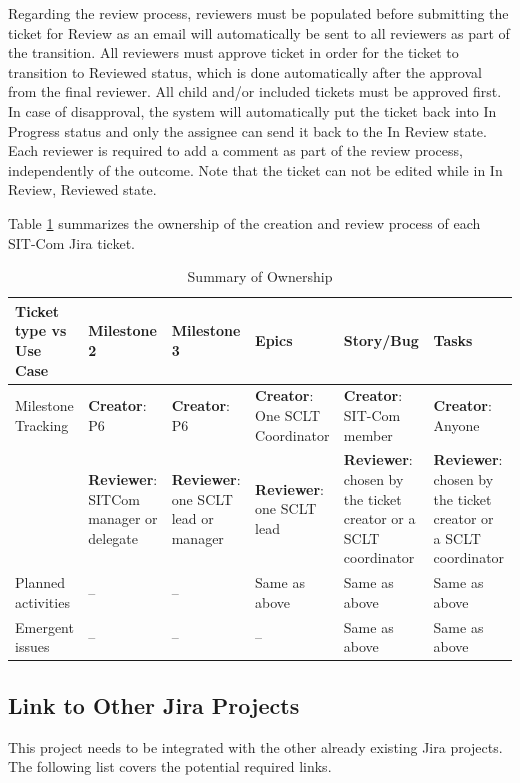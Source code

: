 \documentclass[SE,authoryear,toc]{lsstdoc}
\begin{document}
Regarding the review process, reviewers must be populated before submitting the ticket for Review as an email will automatically be sent to all reviewers as part of the transition. All reviewers must approve ticket in order for the ticket to transition to Reviewed status, which is done automatically after the approval from the final reviewer. All child and/or included tickets must be approved first. 
In case of disapproval, the system will automatically put the ticket back into In Progress status and only the assignee can send it back to the In Review state. Each reviewer is required to add a comment as part of the review process, independently of the outcome. 
Note that the ticket can not be edited while in In Review, Reviewed state.


Table \ref{tab:owner} summarizes the ownership of the creation and review process of each SIT-Com Jira ticket. 
\begin{table}
\begin{center}
\caption{\label{tab:owner} Summary of Ownership}
\begin{tabular}{|p{1.8cm}|p{1.8cm}|p{1.8cm}|p{1.8cm}|p{1.8cm}|p{1.8cm}}
\hline
Ticket type vs Use Case              & Milestone 2	& Milestone 3& Epics	& Story/Bug	& Tasks \\
\hline
\hline
Milestone Tracking & {\bf Creator}: P6 &{\bf Creator}: P6& {\bf Creator}: One SCLT Coordinator & {\bf Creator}: SIT-Com member & {\bf Creator}: Anyone \\
 & {\bf Reviewer}: SITCom manager or delegate & {\bf Reviewer}: one SCLT lead or manager & {\bf Reviewer}: one SCLT lead & {\bf Reviewer}: chosen by the ticket creator or a SCLT coordinator & {\bf Reviewer}: chosen by the ticket creator or a SCLT coordinator \\
\hline
Planned activities & -- & -- & Same as above & Same as above & Same as above \\
\hline
Emergent issues & -- & -- & -- & Same as above & Same as above \\
\hline
\end{tabular}
\end{center}
\end{table}

\subsection{Link to Other Jira Projects}
This project needs to be integrated with the other already existing Jira projects. The following list covers the potential required links.
\end{document}

